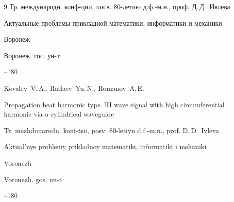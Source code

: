 \begin{thebibliography}{9}
\bookinfo Тр. международн. конф-ции, посв. 80-летию д.ф.-м.н., проф. Д.\,Д.~Ивлева

\inbook Актуальные проблемы прикладной математики, информатики и механики

\publaddr Воронеж

\publ Воронеж. гос. ун-т


--180

\misctransl

\by Kovalev~V.\,A., Radaev~Yu.\,N., Romanov~A.\,E.

\paper Propagation heat  harmonic type~III wave signal with high circumferential harmonic via a cylindrical waveguide

\bookinfo Tr. mezhdunarodn. konf-tsii, posv. 80-letiyu d.f.-m.n., prof. D.\,D.~Ivleva 

\inbook Aktual'nye problemy prikladnoy matematiki, informatiki i mehaniki 

\publaddr Voronezh 

\publ Voronezh. gos. un-t


--180



\end{thebibliography}









\noindent

\hskip6.5cm \thedate \par\noindent

\hskip6.5cm\therevdate\par







\makeengtitle





\renewcommand{\baselinestretch}{0.9}



\newpage



%

